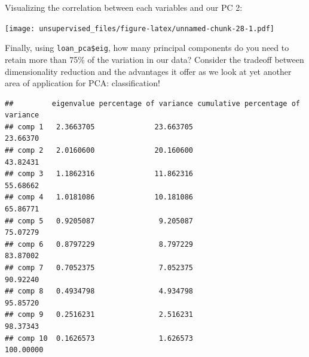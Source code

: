 \documentclass[]{article}
\newenvironment{Shaded}{\begin{snugshade}}{\end{snugshade}}
\newcommand{\DecValTok}[1]{\textcolor[rgb]{0.00,0.00,0.81}{#1}}
\newcommand{\KeywordTok}[1]{\textcolor[rgb]{0.13,0.29,0.53}{\textbf{#1}}}
\newcommand{\NormalTok}[1]{#1}
\newcommand{\OperatorTok}[1]{\textcolor[rgb]{0.81,0.36,0.00}{\textbf{#1}}}
\newcommand{\StringTok}[1]{\textcolor[rgb]{0.31,0.60,0.02}{#1}}
\begin{document}
Visualizing the correlation between each variables and our PC 2:

\begin{Shaded}
\end{Shaded}

\texttt{[image: unsupervised\_files/figure-latex/unnamed-chunk-28-1.pdf]}

Finally, using \texttt{loan\_pca\$eig}, how many principal components do
you need to retain more than 75\% of the variation in our data? Consider
the tradeoff between dimensionality reduction and the advantages it
offer as we look at yet another area of application for PCA:
classification!

\begin{Shaded}
\end{Shaded}

\begin{verbatim}
##         eigenvalue percentage of variance cumulative percentage of variance
## comp 1   2.3663705              23.663705                          23.66370
## comp 2   2.0160600              20.160600                          43.82431
## comp 3   1.1862316              11.862316                          55.68662
## comp 4   1.0181086              10.181086                          65.86771
## comp 5   0.9205087               9.205087                          75.07279
## comp 6   0.8797229               8.797229                          83.87002
## comp 7   0.7052375               7.052375                          90.92240
## comp 8   0.4934798               4.934798                          95.85720
## comp 9   0.2516231               2.516231                          98.37343
## comp 10  0.1626573               1.626573                         100.00000
\end{verbatim}
\end{document}

